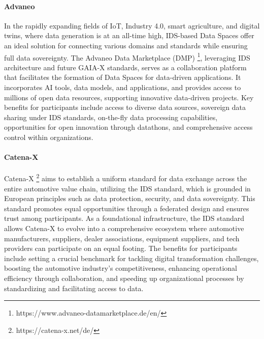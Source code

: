 \paragraph{Advaneo} 
In the rapidly expanding fields of IoT, Industry 4.0, smart agriculture, and digital twins, where data generation is at an all-time high, IDS-based Data Spaces offer an ideal solution for connecting various domains and standards while ensuring full data sovereignty. The Advaneo Data Marketplace (DMP) \footnote{https://www.advaneo-datamarketplace.de/en/}, leveraging IDS architecture and future GAIA-X standards, serves as a collaboration platform that facilitates the formation of Data Spaces for data-driven applications.
It incorporates AI tools, data models, and applications, and provides access to millions of open data resources, supporting innovative data-driven projects. Key benefits for participants include access to diverse data sources, sovereign data sharing under IDS standards, on-the-fly data processing capabilities, opportunities for open innovation through datathons, and comprehensive access control within organizations. \cite{dataspace_radar}

\paragraph{Catena-X}
Catena-X \footnote{https://catena-x.net/de/} aims to establish a uniform standard for data exchange across the entire automotive value chain, utilizing the IDS standard, which is grounded in European principles such as data protection, security, and data sovereignty. This standard promotes equal opportunities through a federated design and ensures trust among participants. As a foundational infrastructure, the IDS standard allows Catena-X to evolve into a comprehensive ecosystem where automotive manufacturers, suppliers, dealer associations, equipment suppliers, and tech providers can participate on an equal footing. The benefits for participants include setting a crucial benchmark for tackling digital transformation challenges, boosting the automotive industry's competitiveness, enhancing operational efficiency through collaboration, and speeding up organizational processes by standardizing and facilitating access to data.


